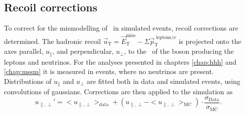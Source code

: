 \subsection{Recoil corrections}
\label{sec:objects_met_recoilcorr}
To correct for the mismodelling of \MET~in simulated events, recoil corrections are determined. 
The hadronic recoil $\vec{u}_{\text{T}} = \vec{E}_{\text{T}}^{\text{miss}} - \Sigma \vec{p}_{\text{T}}^{\text{ leptons}/\nu}$ 
is projected onto the axes parallel, $u_{\parallel}$, and perpendicular, $u_{\perp}$, to the \pT~of the boson producing the leptons
and neutrinos. For the analyses
presented in chapters \ref{chap:hhh} and \ref{chap:mssm} it is measured in \Zmm events, where no neutrinos
are present. Distributions of $u_{\parallel}$ and $u_{\perp}$ are fitted both in data
and simulated events, using convolutions of gaussians. Corrections are then applied to the simulation
as
\begin{equation}\label{eqn:met_recoilcorr}
u_{\parallel,\perp}' = <u_{\parallel,\perp}>_{\text{data}} + (u_{\parallel,\perp} - <u_{\parallel,\perp}>_{\text{MC}}) \cdot \frac{\sigma_{\text{Data}}}{\sigma_{\text{MC}}}.
\end{equation}

